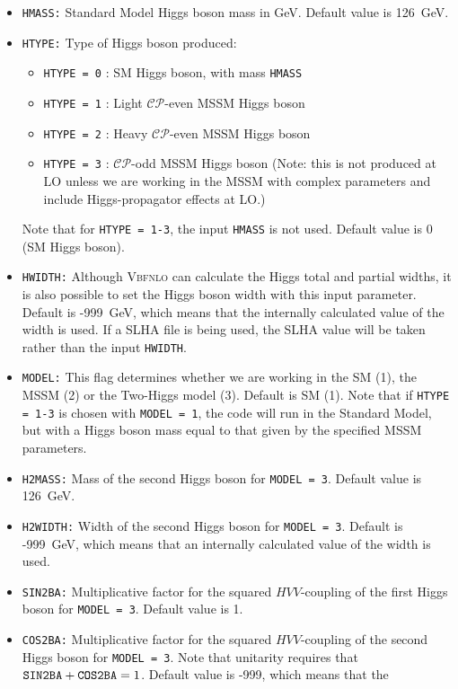 \documentclass[english,12pt]{article}
\begin{document}
\begin{itemize}
\item {\tt HMASS:} Standard Model Higgs boson mass in GeV. Default value is 126~GeV. 
\item {\tt HTYPE:} Type of Higgs boson produced:
  \begin{itemize}
   \item {\tt HTYPE = 0} : SM Higgs boson, with mass {\tt HMASS}
   \item {\tt HTYPE = 1} : Light $\mathcal{CP}$-even MSSM Higgs boson
   \item {\tt HTYPE = 2} : Heavy $\mathcal{CP}$-even MSSM Higgs boson
   \item {\tt HTYPE = 3} : $\mathcal{CP}$-odd MSSM Higgs boson (Note: this is not produced at LO
unless we are working in the MSSM with complex parameters and include
Higgs-propagator effects at LO.)
  \end{itemize}
  Note that for {\tt HTYPE = 1-3}, the input {\tt HMASS} is not used.  Default
value is 0 (SM Higgs boson).
\item{\tt HWIDTH:} Although \textsc{Vbfnlo} can calculate the Higgs total and
partial widths, it is also possible to set the Higgs boson width with this input
parameter.  Default is -999~GeV, which means that the internally calculated
value of the width is used.  If a SLHA file is being used, the SLHA value will
be taken rather than the input {\tt HWIDTH}.
\item {\tt MODEL:} This flag determines whether we are working in the SM
(1), the MSSM (2) or the Two-Higgs model (3). Default is SM (1).  Note
that if {\tt HTYPE = 1-3} is chosen with {\tt MODEL = 1}, the code will
run in the Standard Model, but with a Higgs boson mass equal to that
given by the specified MSSM parameters.
\item{\tt H2MASS:} Mass of the second Higgs boson for {\tt MODEL = 3}.
Default value is 126~GeV.
\item{\tt H2WIDTH:} Width of the second Higgs boson for {\tt MODEL = 3}.
Default is -999~GeV, which means that an internally calculated value of
the width is used.
\item{\tt SIN2BA:} Multiplicative factor for the squared $HVV$-coupling of
the first Higgs boson for {\tt MODEL = 3}. Default value is 1.
\item{\tt COS2BA:} Multiplicative factor for the squared $HVV$-coupling of
the second Higgs boson for {\tt MODEL = 3}. Note that unitarity requires that
${\tt SIN2BA}+{\tt COS2BA}=1$. Default value is -999, which means that the

\end{itemize}
\end{document}
